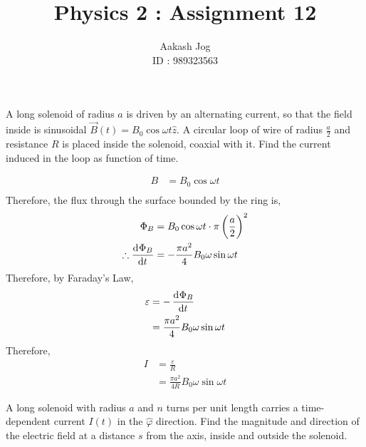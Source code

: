 \documentclass[fleqn, a4paper, 11pt, oneside]{amsart}
\title{Physics 2 : Assignment 12}
\author
{
	Aakash Jog\\
	ID : 989323563
}
\date{\formatdate{10}{6}{2015}}
\theoremstyle{definition}
\theoremstyle{theorem}
\begin{document}

\maketitle

\begin{question}
	A long solenoid of radius $a$ is driven by an alternating current, so that the field inside is sinusoidal $\overrightarrow{B}(t) = B_0 \cos \omega t \hat{z}$.
	A circular loop of wire of radius $\frac{a}{2}$ and resistance $R$ is placed inside the solenoid, coaxial with it.
	Find the current induced in the loop as function of time.
\end{question}

\begin{solution}
	\begin{align*}
		B &= B_0 \cos \omega t\\
	\end{align*}
	Therefore, the flux through the surface bounded by the ring is,
	\begin{align*}
		\Phi_B &= B_0 \cos \omega t \cdot \pi \left( \frac{a}{2} \right)^2\\
		\therefore \dod{\Phi_B}{t} &= -\frac{\pi a^2}{4} B_0 \omega \sin \omega t
	\end{align*}
	Therefore, by Faraday's Law,
	\begin{align*}
		\varepsilon &= -\dod{\Phi_B}{t}\\
		&= \frac{\pi a^2}{4} B_0 \omega \sin \omega t
	\end{align*}
	Therefore,
	\begin{align*}
		I &= \frac{\varepsilon}{R}\\
		&= \frac{\pi a^2}{4 R} B_0 \omega \sin \omega t
	\end{align*}
\end{solution}

\begin{question}
	A long solenoid with radius $a$ and $n$ turns per unit length carries a time-dependent current $I(t)$ in the $\hat{\varphi}$ direction.
	Find the magnitude and direction of the electric field at a distance $s$ from the axis, inside and outside the solenoid.
\end{question}
\end{document}
